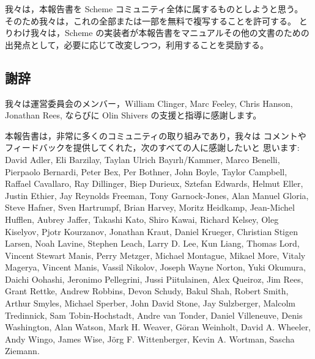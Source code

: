 \medskip

我々は，本報告書を Scheme コミュニティ全体に属するものとしようと思う。
そのため我々は，これの全部または一部を無料で複写することを許可する。
とりわけ我々は，Scheme の実装者が本報告書をマニュアルその他の文書のための
出発点として，必要に応じて改変しつつ，利用することを奨励する。




\subsection*{謝辞}

我々は運営委員会のメンバー，William
Clinger, Marc Feeley, Chris Hanson, Jonathan Rees, ならびに Olin Shivers
の支援と指導に感謝します。

本報告書は，非常に多くのコミュニティの取り組みであり，我々は
コメントやフィードバックを提供してくれた，次のすべての人に感謝したいと
思います: David Adler, Eli Barzilay, Taylan Ulrich
Bay\i{}rl\i/Kammer, Marco Benelli, Pierpaolo Bernardi,
Peter Bex, Per Bothner, John Boyle, Taylor Campbell, Raffael Cavallaro,
Ray Dillinger, Biep Durieux, Sztefan Edwards, Helmut Eller, Justin
Ethier, Jay Reynolds Freeman, Tony Garnock-Jones, Alan Manuel Gloria,
Steve Hafner, Sven Hartrumpf, Brian Harvey, Moritz Heidkamp, Jean-Michel
Hufflen, Aubrey Jaffer, Takashi Kato, Shiro Kawai, Richard Kelsey, Oleg
Kiselyov, Pjotr Kourzanov, Jonathan Kraut, Daniel Krueger, Christian
Stigen Larsen, Noah Lavine, Stephen Leach, Larry D. Lee, Kun Liang,
Thomas Lord, Vincent Stewart Manis, Perry Metzger, Michael Montague,
Mikael More, Vitaly Magerya, Vincent Manis, Vassil Nikolov, Joseph
Wayne Norton, Yuki Okumura, Daichi Oohashi, Jeronimo Pellegrini, Jussi
Piitulainen, Alex Queiroz, Jim Rees, Grant Rettke, Andrew Robbins, Devon
Schudy, Bakul Shah, Robert Smith, Arthur Smyles, Michael Sperber, John
David Stone, Jay Sulzberger, Malcolm Tredinnick, Sam Tobin-Hochstadt,
Andre van Tonder, Daniel Villeneuve, Denis Washington, Alan Watson,
Mark H.  Weaver, G\"oran Weinholt, David A. Wheeler, Andy Wingo, James
Wise, J\"org F. Wittenberger, Kevin A. Wortman, Sascha Ziemann.

